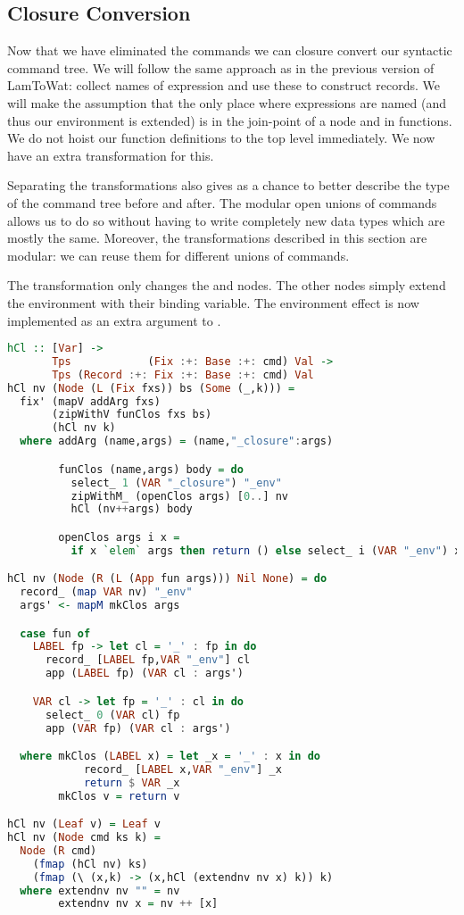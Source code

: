 \subsection{\label{subsection:closconvert2}Closure Conversion}
Now that we have eliminated the  commands we can closure convert our syntactic command tree. We will follow the same approach as in the previous version of LamToWat: collect names of expression and use these to construct records. We will make the assumption that the only place where expressions are named (and thus our environment is extended) is in the join-point of a node and in functions. We do not hoist our function definitions to the top level immediately. We now have an extra transformation for this.

Separating the transformations also gives as a chance to better describe the type of the command tree before and after. The modular open unions of commands allows us to do so without having to write completely new data types which are mostly the same. Moreover, the transformations described in this section are modular: we can reuse them for different unions of commands.

The transformation only changes the  and  nodes. The other nodes simply extend the environment with their binding variable. The environment effect is now implemented as an extra argument to .

\begin{lstlisting}[language=Haskell]
hCl :: [Var] ->
       Tps            (Fix :+: Base :+: cmd) Val ->
       Tps (Record :+: Fix :+: Base :+: cmd) Val
hCl nv (Node (L (Fix fxs)) bs (Some (_,k))) =
  fix' (mapV addArg fxs)
       (zipWithV funClos fxs bs)
       (hCl nv k)
  where addArg (name,args) = (name,"_closure":args)

        funClos (name,args) body = do
          select_ 1 (VAR "_closure") "_env"
          zipWithM_ (openClos args) [0..] nv
          hCl (nv++args) body

        openClos args i x =
          if x `elem` args then return () else select_ i (VAR "_env") x

hCl nv (Node (R (L (App fun args))) Nil None) = do
  record_ (map VAR nv) "_env"
  args' <- mapM mkClos args

  case fun of
    LABEL fp -> let cl = '_' : fp in do
      record_ [LABEL fp,VAR "_env"] cl
      app (LABEL fp) (VAR cl : args')

    VAR cl -> let fp = '_' : cl in do
      select_ 0 (VAR cl) fp
      app (VAR fp) (VAR cl : args')

  where mkClos (LABEL x) = let _x = '_' : x in do
            record_ [LABEL x,VAR "_env"] _x
            return $ VAR _x
        mkClos v = return v

hCl nv (Leaf v) = Leaf v
hCl nv (Node cmd ks k) =
  Node (R cmd)
    (fmap (hCl nv) ks)
    (fmap (\ (x,k) -> (x,hCl (extendnv nv x) k)) k)
  where extendnv nv "" = nv
        extendnv nv x = nv ++ [x]
\end{lstlisting}

